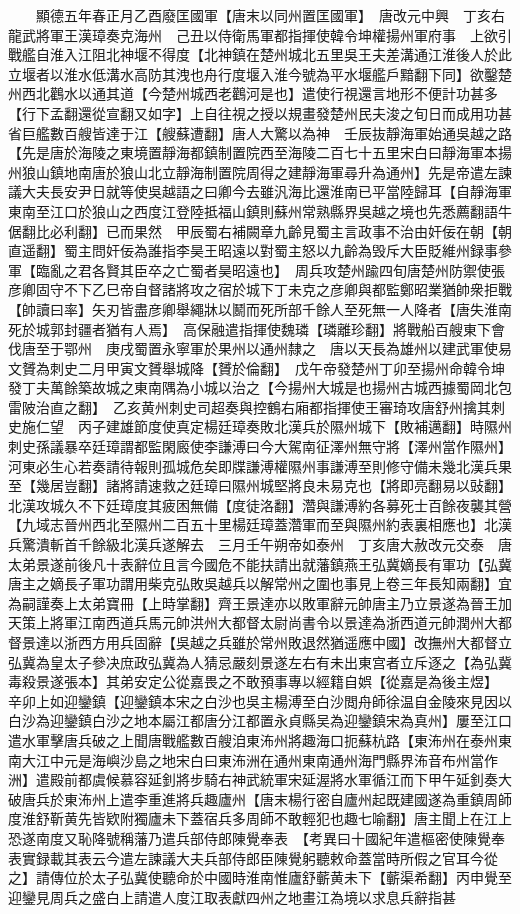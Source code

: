 　　顯德五年春正月乙酉廢匡國軍【唐末以同州置匡國軍】　唐改元中興　丁亥右龍武將軍王漢璋奏克海州　己丑以侍衛馬軍都指揮使韓令坤權揚州軍府事　上欲引戰艦自淮入江阻北神堰不得度【北神鎮在楚州城北五里吳王夫差溝通江淮後人於此立堰者以淮水低溝水高防其洩也舟行度堰入淮今號為平水堰艦戶黯翻下同】欲鑿楚州西北鸛水以通其道【今楚州城西老鸛河是也】遣使行視還言地形不便計功甚多【行下孟翻還從宣翻又如字】上自往視之授以規畫發楚州民夫浚之旬日而成用功甚省巨艦數百艘皆達于江【艘蘇遭翻】唐人大驚以為神　壬辰抜靜海軍始通吳越之路【先是唐於海陵之東境置靜海都鎮制置院西至海陵二百七十五里宋白曰靜海軍本揚州狼山鎮地南唐於狼山北立靜海制置院周得之建靜海軍尋升為通州】先是帝遣左諫議大夫長安尹日就等使吳越語之曰卿今去雖汎海比還淮南已平當陸歸耳【自靜海軍東南至江口於狼山之西度江登陸抵福山鎮則蘇州常熟縣界吳越之境也先悉薦翻語牛倨翻比必利翻】已而果然　甲辰蜀右補闕章九齡見蜀主言政事不治由奸佞在朝【朝直遥翻】蜀主問奸佞為誰指李昊王昭遠以對蜀主怒以九齡為毁斥大臣貶維州録事參軍【臨亂之君各賢其臣卒之亡蜀者昊昭遠也】　周兵攻楚州踰四旬唐楚州防禦使張彦卿固守不下乙巳帝自督諸將攻之宿於城下丁未克之彦卿與都監鄭昭業猶帥衆拒戰【帥讀曰率】矢刃皆盡彦卿舉繩牀以鬭而死所部千餘人至死無一人降者【唐失淮南死於城郭封疆者猶有人焉】　高保融遣指揮使魏璘【璘離珍翻】將戰船百艘東下會伐唐至于鄂州　庚戌蜀置永寧軍於果州以通州隸之　唐以天長為雄州以建武軍使易文贇為刺史二月甲寅文贇舉城降【贇於倫翻】　戊午帝發楚州丁卯至揚州命韓令坤發丁夫萬餘築故城之東南隅為小城以治之【今揚州大城是也揚州古城西據蜀岡北包雷陂治直之翻】　乙亥黄州刺史司超奏與控鶴右廂都指揮使王審琦攻唐舒州擒其刺史施仁望　丙子建雄節度使真定楊廷璋奏敗北漢兵於隰州城下【敗補邁翻】時隰州刺史孫議暴卒廷璋謂都監閑廄使李謙溥曰今大駕南征澤州無守將【澤州當作隰州】河東必生心若奏請待報則孤城危矣即牒謙溥權隰州事謙溥至則修守備未幾北漢兵果至【幾居豈翻】諸將請速救之廷璋曰隰州城堅將良未易克也【將即亮翻易以䜴翻】北漢攻城久不下廷璋度其疲困無備【度徒洛翻】濳與謙溥約各募死士百餘夜襲其營【九域志晉州西北至隰州二百五十里楊廷璋蓋濳軍而至與隰州約表裏相應也】北漢兵驚潰斬首千餘級北漢兵遂解去　三月壬午朔帝如泰州　丁亥唐大赦改元交泰　唐太弟景遂前後凡十表辭位且言今國危不能扶請出就藩鎮燕王弘冀嫡長有軍功【弘冀唐主之嫡長子軍功謂用柴克弘敗吳越兵以解常州之圍也事見上卷三年長知兩翻】宜為嗣謹奏上太弟寶冊【上時掌翻】齊王景達亦以敗軍辭元帥唐主乃立景遂為晉王加天策上將軍江南西道兵馬元帥洪州大都督太尉尚書令以景達為浙西道元帥潤州大都督景達以浙西方用兵固辭【吳越之兵雖於常州敗退然猶遥應中國】改撫州大都督立弘冀為皇太子參决庶政弘冀為人猜忌嚴刻景遂左右有未出東宫者立斥逐之【為弘冀毒殺景遂張本】其弟安定公從嘉畏之不敢預事專以經籍自娯【從嘉是為後主煜】　辛卯上如迎鑾鎮【迎鑾鎮本宋之白沙也吳主楊溥至白沙閲舟師徐温自金陵來見因以白沙為迎鑾鎮白沙之地本屬江都唐分江都置永貞縣吴為迎鑾鎮宋為真州】屢至江口遣水軍擊唐兵破之上聞唐戰艦數百艘洎東㳍州將趣海口扼蘇杭路【東㳍州在泰州東南大江中元是海嶼沙島之地宋白曰東㳍洲在通州東南通州海門縣界㳍音布州當作洲】遣殿前都虞候慕容延釗將步騎右神武統軍宋延渥將水軍循江而下甲午延釗奏大破唐兵於東㳍州上遣李重進將兵趣廬州【唐末楊行密自廬州起既建國遂為重鎮周師度淮舒靳黄先皆欵附獨廬未下蓋宿兵多周師不敢輕犯也趣七喻翻】唐主聞上在江上恐遂南度又恥降號稱藩乃遣兵部侍郎陳覺奉表　【考異曰十國紀年遣樞密使陳覺奉表實録載其表云今遣左諫議大夫兵部侍郎臣陳覺躬聽敕命蓋當時所假之官耳今從之】請傳位於太子弘冀使聽命於中國時淮南惟廬舒蘄黄未下【蘄渠希翻】丙申覺至迎鑾見周兵之盛白上請遣人度江取表獻四州之地畫江為境以求息兵辭指甚